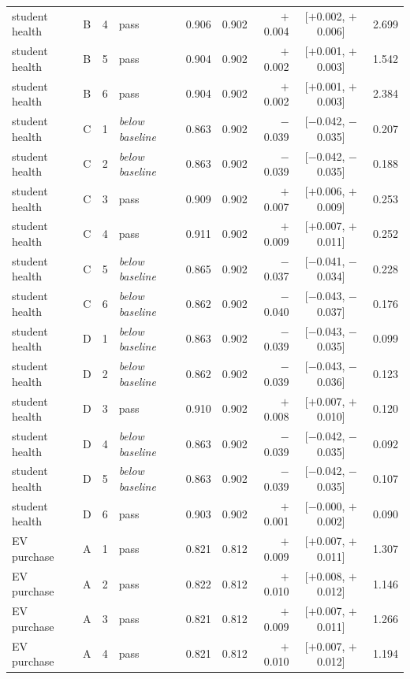 {\begin{longtable}{lccl rrrcr}
student health & B & 4 & pass & 0.906 & 0.902 & $+$0.004 & [$+$0.002, $+$0.006] & 2.699 \\
student health & B & 5 & pass & 0.904 & 0.902 & $+$0.002 & [$+$0.001, $+$0.003] & 1.542 \\
student health & B & 6 & pass & 0.904 & 0.902 & $+$0.002 & [$+$0.001, $+$0.003] & 2.384 \\
\addlinespace[2pt]
student health & C & 1 & \emph{below baseline} & 0.863 & 0.902 & $-$0.039 & [$-$0.042, $-$0.035] & 0.207 \\
student health & C & 2 & \emph{below baseline} & 0.863 & 0.902 & $-$0.039 & [$-$0.042, $-$0.035] & 0.188 \\
student health & C & 3 & pass & 0.909 & 0.902 & $+$0.007 & [$+$0.006, $+$0.009] & 0.253 \\
student health & C & 4 & pass & 0.911 & 0.902 & $+$0.009 & [$+$0.007, $+$0.011] & 0.252 \\
student health & C & 5 & \emph{below baseline} & 0.865 & 0.902 & $-$0.037 & [$-$0.041, $-$0.034] & 0.228 \\
student health & C & 6 & \emph{below baseline} & 0.862 & 0.902 & $-$0.040 & [$-$0.043, $-$0.037] & 0.176 \\
\addlinespace[2pt]
student health & D & 1 & \emph{below baseline} & 0.863 & 0.902 & $-$0.039 & [$-$0.043, $-$0.035] & 0.099 \\
student health & D & 2 & \emph{below baseline} & 0.862 & 0.902 & $-$0.039 & [$-$0.043, $-$0.036] & 0.123 \\
student health & D & 3 & pass & 0.910 & 0.902 & $+$0.008 & [$+$0.007, $+$0.010] & 0.120 \\
student health & D & 4 & \emph{below baseline} & 0.863 & 0.902 & $-$0.039 & [$-$0.042, $-$0.035] & 0.092 \\
student health & D & 5 & \emph{below baseline} & 0.863 & 0.902 & $-$0.039 & [$-$0.042, $-$0.035] & 0.107 \\
student health & D & 6 & pass & 0.903 & 0.902 & $+$0.001 & [$-$0.000, $+$0.002] & 0.090 \\
\midrule
EV purchase & A & 1 & pass & 0.821 & 0.812 & $+$0.009 & [$+$0.007, $+$0.011] & 1.307 \\
EV purchase & A & 2 & pass & 0.822 & 0.812 & $+$0.010 & [$+$0.008, $+$0.012] & 1.146 \\
EV purchase & A & 3 & pass & 0.821 & 0.812 & $+$0.009 & [$+$0.007, $+$0.011] & 1.266 \\
EV purchase & A & 4 & pass & 0.821 & 0.812 & $+$0.010 & [$+$0.007, $+$0.012] & 1.194 \\

\end{longtable}}
